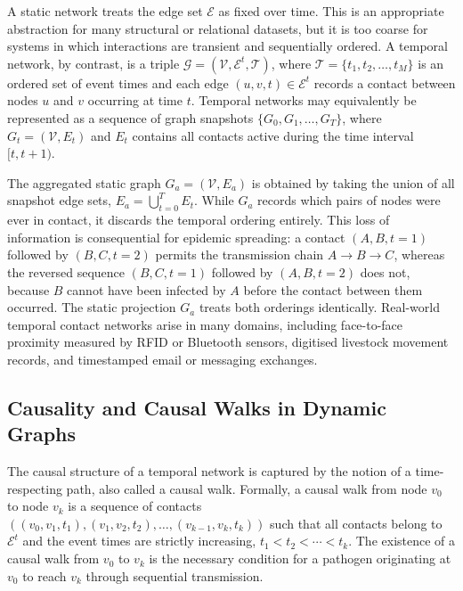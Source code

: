 A static network treats the edge set $\mathcal{E}$ as fixed over time. This is an appropriate abstraction for many structural or relational datasets, but it is too coarse for systems in which interactions are transient and sequentially ordered. A temporal network, by contrast, is a triple $\mathcal{G} = (\mathcal{V}, \mathcal{E}^t, \mathcal{T})$, where $\mathcal{T} = \{t_1, t_2, \ldots, t_M\}$ is an ordered set of event times and each edge $(u, v, t) \in \mathcal{E}^t$ records a contact between nodes $u$ and $v$ occurring at time $t$. Temporal networks may equivalently be represented as a sequence of graph snapshots $\{G_0, G_1, \ldots, G_T\}$, where $G_t = (\mathcal{V}, E_t)$ and $E_t$ contains all contacts active during the time interval $[t, t+1)$.

The aggregated static graph $G_a = (\mathcal{V}, E_a)$ is obtained by taking the union of all snapshot edge sets, $E_a = \bigcup_{t=0}^{T} E_t$. While $G_a$ records which pairs of nodes were ever in contact, it discards the temporal ordering entirely. This loss of information is consequential for epidemic spreading: a contact $(A, B, t=1)$ followed by $(B, C, t=2)$ permits the transmission chain $A \to B \to C$, whereas the reversed sequence $(B, C, t=1)$ followed by $(A, B, t=2)$ does not, because $B$ cannot have been infected by $A$ before the contact between them occurred. The static projection $G_a$ treats both orderings identically. Real-world temporal contact networks arise in many domains, including face-to-face proximity measured by RFID or Bluetooth sensors, digitised livestock movement records, and timestamped email or messaging exchanges.

\subsection{Causality and Causal Walks in Dynamic Graphs}

The causal structure of a temporal network is captured by the notion of a time-respecting path, also called a causal walk. Formally, a causal walk from node $v_0$ to node $v_k$ is a sequence of contacts $((v_0, v_1, t_1), (v_1, v_2, t_2), \ldots, (v_{k-1}, v_k, t_k))$ such that all contacts belong to $\mathcal{E}^t$ and the event times are strictly increasing, $t_1 < t_2 < \cdots < t_k$. The existence of a causal walk from $v_0$ to $v_k$ is the necessary condition for a pathogen originating at $v_0$ to reach $v_k$ through sequential transmission.

